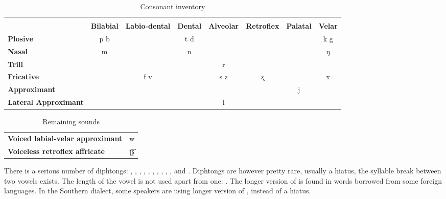 \begin{table}
    \caption{Consonant inventory}
    \begin{tabular}{lccccccc}
        \\
        \\
                                     & \textbf{Bilabial} & \textbf{Labio-dental} & \textbf{Dental} & \textbf{Alveolar} & \textbf{Retroflex} & \textbf{Palatal} & \textbf{Velar} \\
        \textbf{Plosive}             & p b               &                       & t d             &                   &                    &                  & k g            \\
        \textbf{Nasal}               & m                 &                       & n               &                   &                    &                  & ŋ              \\
        \textbf{Trill}               &                   &                       &                 & r                 &                    &                  &                \\
        \textbf{Fricative}           &                   & f v                   &                 & s z               & ʐ                  &                  & x              \\
        \textbf{Approximant}         &                   &                       &                 &                   &                    & j                &                \\
        \textbf{Lateral Approximant} &                   &                       &                 & l                 &                    &                  &                \\
    \end{tabular}
    \label{tab:consonants}
\end{table}

\begin{table}
    \caption{Remaining sounds}
    \begin{tabular}{lc}
        \textbf{Voiced labial-velar approximant} & w  \\
        \textbf{Voiceless retroflex affricate}   & ʈ͡ʂ
    \end{tabular}
    \label{tab:consonants2}
\end{table}

There is a serious number of diphtongs: , , , ,
, , , , , ,  and .
Diphtongs are however pretty rare, usually a hiatus, the syllable break between
two vowels exists. The length of the vowel is not used apart from one: .
The longer version of  is found in words borrowed from some foreign
languages. In the Southern dialect, some speakers are using longer version of
,  instead of a hiatus.

